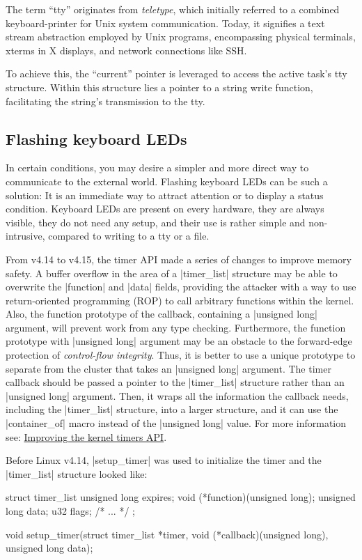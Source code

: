 \documentclass[10pt, oneside]{book}
\begin{document}
The term ``tty'' originates from \emph{teletype}, which initially referred to a combined keyboard-printer for Unix system communication.
Today, it signifies a text stream abstraction employed by Unix programs, encompassing physical terminals,
xterms in X displays, and network connections like SSH.

To achieve this, the ``current'' pointer is leveraged to access the active task's tty structure.
Within this structure lies a pointer to a string write function, facilitating the string's transmission to the tty.


\subsection{Flashing keyboard LEDs}
\label{sec:flash_kb_led}
In certain conditions, you may desire a simpler and more direct way to communicate to the external world.
Flashing keyboard LEDs can be such a solution: It is an immediate way to attract attention or to display a status condition.
Keyboard LEDs are present on every hardware, they are always visible, they do not need any setup, and their use is rather simple and non-intrusive, compared to writing to a tty or a file.

From v4.14 to v4.15, the timer API made a series of changes to improve memory safety.
A buffer overflow in the area of a \cpp|timer_list| structure may be able to overwrite the \cpp|function| and \cpp|data| fields, providing the attacker with a way to use return-oriented programming (ROP) to call arbitrary functions within the kernel.
Also, the function prototype of the callback, containing a \cpp|unsigned long| argument, will prevent work from any type checking.
Furthermore, the function prototype with \cpp|unsigned long| argument may be an obstacle to the forward-edge protection of \textit{control-flow integrity}.
Thus, it is better to use a unique prototype to separate from the cluster that takes an \cpp|unsigned long| argument.
The timer callback should be passed a pointer to the \cpp|timer_list| structure rather than an \cpp|unsigned long| argument.
Then, it wraps all the information the callback needs, including the \cpp|timer_list| structure, into a larger structure, and it can use the \cpp|container_of| macro instead of the \cpp|unsigned long| value.
For more information see: \href{https://lwn.net/Articles/735887/}{Improving the kernel timers API}.

Before Linux v4.14, \cpp|setup_timer| was used to initialize the timer and the \cpp|timer_list| structure looked like:
\begin{code}
struct timer_list {
    unsigned long expires;
    void (*function)(unsigned long);
    unsigned long data;
    u32 flags;
    /* ... */
};

void setup_timer(struct timer_list *timer, void (*callback)(unsigned long),
                 unsigned long data);
\end{code}
\end{document}
